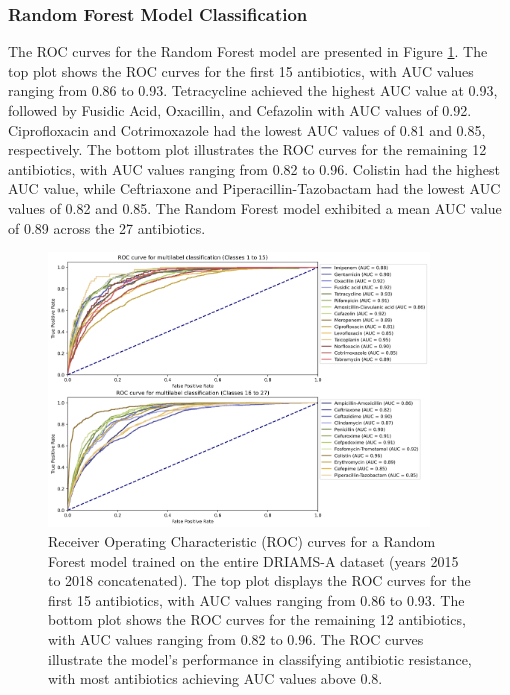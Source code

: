 \documentclass[english,11pt,a4paper,titlepage]{article}
\begin{document}
\subsubsection*{Random Forest Model Classification}
The ROC curves for the Random Forest model are presented in Figure \ref{fig:ROC_rf}. The top plot shows the ROC curves for the first 15 antibiotics, with AUC values ranging from 0.86 to 0.93. Tetracycline achieved the highest AUC value at 0.93, followed by Fusidic Acid, Oxacillin, and Cefazolin with AUC values of 0.92. Ciprofloxacin and Cotrimoxazole had the lowest AUC values of 0.81 and 0.85, respectively. The bottom plot illustrates the ROC curves for the remaining 12 antibiotics, with AUC values ranging from 0.82 to 0.96. Colistin had the highest AUC value, while Ceftriaxone and Piperacillin-Tazobactam had the lowest AUC values of 0.82 and 0.85. The Random Forest model exhibited a mean AUC value of 0.89 across the 27 antibiotics.
\begin{figure}[h]
	\centering
	\includegraphics[width=0.9\textwidth]{img/ROC_curves_rf.png}
	\caption{Receiver Operating Characteristic (ROC) curves for a Random Forest model trained on the entire DRIAMS-A dataset (years 2015 to 2018 concatenated). The top plot displays the ROC curves for the first 15 antibiotics, with AUC values ranging from 0.86 to 0.93. The bottom plot shows the ROC curves for the remaining 12 antibiotics, with AUC values ranging from 0.82 to 0.96. The ROC curves illustrate the model's performance in classifying antibiotic resistance, with most antibiotics achieving AUC values above 0.8.}
	\label{fig:ROC_rf}
\end{figure}
\end{document}
